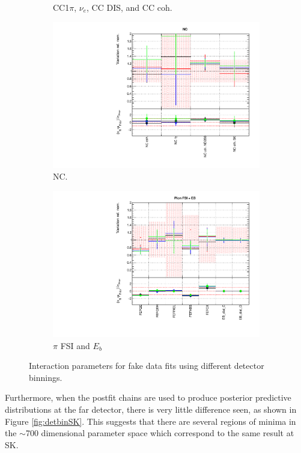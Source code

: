 \begin{figure}
\begin{subfigure}{0.49\textwidth}
  \caption{CC1$\pi$, $\nu_e$, CC DIS, and CC coh.}
  \label{fig:}
\end{subfigure}
\begin{subfigure}{0.49\textwidth}
  \centering
  \includegraphics[width=0.95\linewidth]{figs/detcovbinxsec_3}
  \caption{NC.}
  \label{fig:}
\end{subfigure}
\begin{subfigure}{0.49\textwidth}
  \centering
  \includegraphics[width=0.95\linewidth]{figs/detcovbinxsec_4}
  \caption{$\pi$ FSI and $E_b$}
  \label{fig:}
\end{subfigure}
\caption{Interaction parameters for fake data fits using different detector binnings.}
\label{fig:detcovbinxsec}
\end{figure}

Furthermore, when the postfit chains are used to produce posterior predictive distributions at the far detector, there is very little difference seen, as shown in Figure \ref{fig:detbinSK}. This suggests that there are several regions of minima in the $\sim$700 dimensional parameter space which correspond to the same result at SK. 

